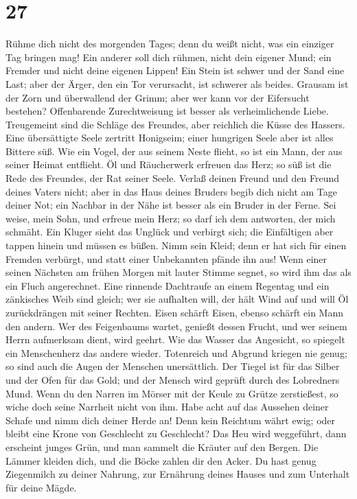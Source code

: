 \hypertarget{section-26}{%
\section{27}\label{section-26}}

 Rühme dich nicht des morgenden Tages; denn du weißt
nicht, was ein einziger Tag bringen mag!  Ein anderer soll
dich rühmen, nicht dein eigener Mund; ein Fremder und nicht deine
eigenen Lippen!  Ein Stein ist schwer und der Sand eine
Last; aber der Ärger, den ein Tor verursacht, ist schwerer als beides.
 Grausam ist der Zorn und überwallend der Grimm; aber wer
kann vor der Eifersucht bestehen?  Offenbarende
Zurechtweisung ist besser als verheimlichende Liebe. 
Treugemeint sind die Schläge des Freundes, aber reichlich die Küsse des
Hassers.  Eine übersättigte Seele zertritt Honigseim;
einer hungrigen Seele aber ist alles Bittere süß.  Wie ein
Vogel, der aus seinem Neste flieht, so ist ein Mann, der aus seiner
Heimat entflieht.  Öl und Räucherwerk erfreuen das Herz;
so süß ist die Rede des Freundes, der Rat seiner Seele. 
Verlaß deinen Freund und den Freund deines Vaters nicht; aber in das
Haus deines Bruders begib dich nicht am Tage deiner Not; ein Nachbar in
der Nähe ist besser als ein Bruder in der Ferne.  Sei
weise, mein Sohn, und erfreue mein Herz; so darf ich dem antworten, der
mich schmäht.  Ein Kluger sieht das Unglück und verbirgt
sich; die Einfältigen aber tappen hinein und müssen es büßen.
 Nimm sein Kleid; denn er hat sich für einen Fremden
verbürgt, und statt einer Unbekannten pfände ihn aus! 
Wenn einer seinen Nächsten am frühen Morgen mit lauter Stimme segnet, so
wird ihm das als ein Fluch angerechnet.  Eine rinnende
Dachtraufe an einem Regentag und ein zänkisches Weib sind gleich;
 wer sie aufhalten will, der hält Wind auf und will Öl
zurückdrängen mit seiner Rechten.  Eisen schärft Eisen,
ebenso schärft ein Mann den andern.  Wer des Feigenbaums
wartet, genießt dessen Frucht, und wer seinem Herrn aufmerksam dient,
wird geehrt.  Wie das Wasser das Angesicht, so spiegelt
ein Menschenherz das andere wieder.  Totenreich und
Abgrund kriegen nie genug; so sind auch die Augen der Menschen
unersättlich.  Der Tiegel ist für das Silber und der Ofen
für das Gold; und der Mensch wird geprüft durch des Lobredners Mund.
 Wenn du den Narren im Mörser mit der Keule zu Grütze
zerstießest, so wiche doch seine Narrheit nicht von ihm. 
Habe acht auf das Aussehen deiner Schafe und nimm dich deiner Herde an!
 Denn kein Reichtum währt ewig; oder bleibt eine Krone
von Geschlecht zu Geschlecht?  Das Heu wird weggeführt,
dann erscheint junges Grün, und man sammelt die Kräuter auf den Bergen.
 Die Lämmer kleiden dich, und die Böcke zahlen dir den
Acker.  Du hast genug Ziegenmilch zu deiner Nahrung, zur
Ernährung deines Hauses und zum Unterhalt für deine Mägde.


